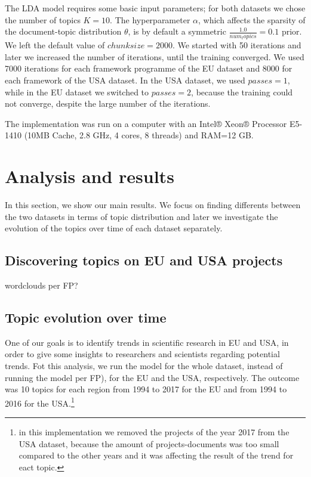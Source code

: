 \documentclass[12pt]{report}
\begin{document}
The LDA model requires some basic input parameters; for both datasets we chose
the number of topics $K=10$. The hyperparameter $\alpha$, which affects the
sparsity of the document-topic distribution $\theta$, is by default a symmetric
$\frac{1.0}{num_topics} = 0.1$ prior. We left the default value of $chunksize=2000$. We
started with 50 iterations and later we increased the number of iterations,
until the training converged. We used 7000 iterations for each framework
programme of the EU dataset and 8000 for each framework of the USA dataset. In
the USA dataset, we used $passes=1$, while in the EU dataset we switched to
$passes=2$, because the training could not converge, despite the large number of
the iterations.

The implementation was run on a computer with an Intel® Xeon® Processor E5-1410
(10MB Cache, 2.8 GHz, 4 cores, 8 threads) and RAM=12 GB.


\section{Analysis and results}

In this section, we show our main results. We focus on finding differents
between the two datasets in terms of topic distribution and later we 
investigate the evolution of the topics over time of each dataset separately.


\subsection{Discovering topics on EU and USA projects}

wordclouds per FP?


\subsection{Topic evolution over time}

One of our goals is to identify trends in scientific research in EU and USA, in
order to give some insights to researchers and scientists regarding potential
trends. Fot this analysis, we run the model for the whole dataset, instead of
running the model per FP), for the EU and the USA, respectively. The outcome was
10 topics for each region from 1994 to 2017 for the EU and from 1994 to 2016 for
the USA.\footnote{in this implementation we removed the projects of the year
2017 from the USA dataset, because the amount of projects-documents was too
small compared to the other years and it was affecting the result of the trend
for eact topic.}
\end{document}
